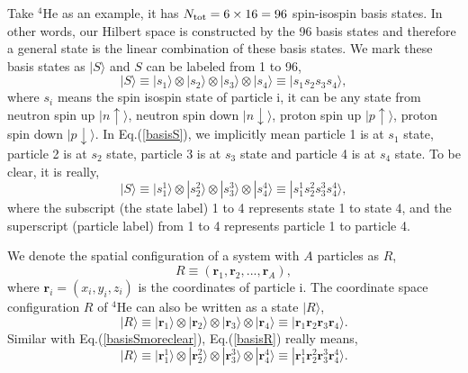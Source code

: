 \documentclass[12pt,letterpaper,UTF8]{report}
\begin{document}
Take $^4$He as an example, it has $N_{\rm{tot}}=6 \times 16=96$ spin-isospin basis states.
In other words, our Hilbert space is constructed by the 96 basis states and therefore a general state is the linear combination of these basis states. We mark these basis states as $| S \rangle$ and $S$ can be labeled from 1 to 96,
\begin{equation}
| S \rangle \equiv  | s_1\rangle \otimes | s_2 \rangle \otimes | s_3 \rangle \otimes | s_4 \rangle \equiv | s_1 s_2 s_3 s_4 \rangle, \label{basisS}
\end{equation}
where $s_i$ means the spin isospin state of particle i, it can be any state from neutron spin up $|n \uparrow \rangle$, neutron spin down $|n \downarrow\rangle$, proton spin up $|p \uparrow\rangle$, proton spin down $|p \downarrow\rangle$.
In Eq.(\ref{basisS}), we implicitly mean particle 1 is at $s_1$ state, particle 2 is at $s_2$ state, particle 3 is at $s_3$ state and particle 4 is at $s_4$ state. To be clear, it is really,
\begin{equation}
| S \rangle \equiv  | s^1_1\rangle \otimes | s^2_2 \rangle \otimes | s^3_3 \rangle \otimes | s^4_4 \rangle
\equiv | s^1_1 s^2_2 s^3_3 s^4_4 \rangle, \label{basisSmoreclear}
\end{equation}
where the subscript (the state label) 1 to 4 represents state 1 to state 4, and the superscript (particle label) from 1 to 4 represents particle 1 to particle 4.

We denote the spatial configuration of a system with $A$ particles as $R$,
\begin{equation}
R \equiv ( \bm{r}_1, \bm{r}_2, ..., \bm{r}_A  ) , \label{Rdef}
\end{equation}
where $\bm{r}_i=(x_i,y_i,z_i)$ is the coordinates of particle i.
The coordinate space configuration $R$ of $^4$He can also be written as a state $| R \rangle$,
\begin{equation}
| R \rangle \equiv  | \bm{r}_1\rangle \otimes | \bm{r}_2 \rangle \otimes | \bm{r}_3 \rangle \otimes | \bm{r}_4 \rangle \equiv | \bm{r}_1 \bm{r}_2 \bm{r}_3 \bm{r}_4 \rangle. \label{basisR}
\end{equation}
Similar with Eq.(\ref{basisSmoreclear}), Eq.(\ref{basisR}) really means,
\begin{equation}
| R \rangle \equiv  | \bm{r}^1_1\rangle \otimes | \bm{r}^2_2 \rangle \otimes | \bm{r}^3_3 \rangle \otimes | \bm{r}^4_4 \rangle
\equiv | \bm{r}^1_1 \bm{r}^2_2 \bm{r}^3_3 \bm{r}^4_4 \rangle. \label{basisRmoreclear}
\end{equation}
\end{document}
